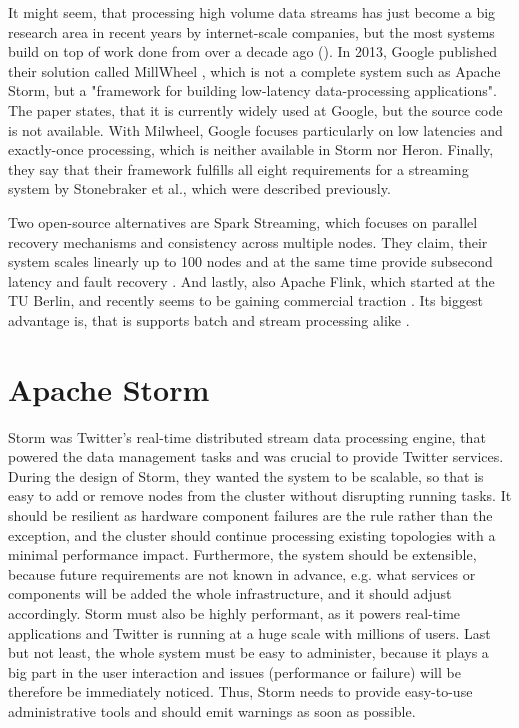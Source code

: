 \documentclass[conference]{IEEEtran}
\begin{document}
It might seem, that processing high volume data streams has just become a big research area in recent years by internet-scale companies, but the most systems build on top of work done from over a decade ago (\cite{StreamStanford, Aurora}).
In 2013, Google published their solution called MillWheel \cite{Millwheel}, which is not a complete system such as Apache Storm, but a "framework for building low-latency data-processing applications".
The paper states, that it is currently widely used at Google, but the source code is not available.
With Milwheel, Google focuses particularly on low latencies and exactly-once processing, which is neither available in Storm nor Heron.
Finally, they say that their framework fulfills all eight requirements for a streaming system by Stonebraker et al., which were described previously.

Two open-source alternatives are Spark Streaming, which focuses on parallel recovery mechanisms and consistency across multiple nodes.
They claim, their system scales linearly up to 100 nodes and at the same time provide subsecond latency and fault recovery \cite{SparkStreaming}.
And lastly, also Apache Flink, which started at the TU Berlin, and recently seems to be gaining commercial traction \cite{FlinkUpcoming}.
Its biggest advantage is, that is supports batch and stream processing alike \cite{Flink}.

\section{Apache Storm}
\label{sec:ApacheStorm}

Storm was Twitter's real-time distributed stream data processing engine, that powered the data management tasks and was crucial to provide Twitter services.
During the design of Storm, they wanted the system to be scalable, so that is easy to add or remove nodes from the cluster without disrupting running tasks.
It should be resilient as hardware component failures are the rule rather than the exception, and the cluster should continue processing existing topologies with a minimal performance impact.
Furthermore, the system should be extensible, because future requirements are not known in advance, e.g. what services or components will be added the whole infrastructure, and it should adjust accordingly.
Storm must also be highly performant, as it powers real-time applications and Twitter is running at a huge scale with millions of users.
Last but not least, the whole system must be easy to administer, because it plays a big part in the user interaction and issues (performance or failure) will be therefore be immediately noticed.
Thus, Storm needs to provide easy-to-use administrative tools and should emit warnings as soon as possible.
\end{document}
